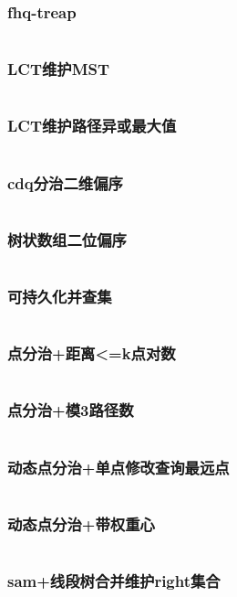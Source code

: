\documentclass[a4paper,12pt]{article}
\begin{document}
\subsubsection{fhq-treap}
\inputminted[]{c++}{code/luoguP3369.cpp}
\subsubsection{LCT维护MST}
\inputminted[]{c++}{code/nc888E.cpp}
\subsubsection{LCT维护路径异或最大值}
\inputminted[]{c++}{code/luoguP3690.cpp}
\subsubsection{cdq分治二维偏序}
\inputminted[]{c++}{code/19njA.cpp}
\subsubsection{树状数组二位偏序}
\inputminted[]{c++}{code/19xzI.cpp}
\subsubsection{可持久化并查集}
\inputminted[]{c++}{code/luoguP3402.cpp}
\subsubsection{点分治+距离<=k点对数}
\inputminted[]{c++}{code/luoguP4178.cpp}
\newpage
\subsubsection{点分治+模3路径数}
\inputminted[]{c++}{code/not/a.cpp}
\subsubsection{动态点分治+单点修改查询最远点}
\inputminted[]{c++}{code/not/b.cpp}
\subsubsection{动态点分治+带权重心}
\inputminted[]{c++}{code/not/c.cpp}

\newpage
\subsubsection{sam+线段树合并维护right集合}
\inputminted[]{c++}{code/cf1037H.cpp}
\end{document}
